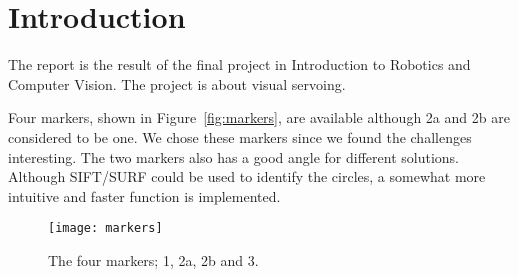 \section{Introduction}
The report is the result of the final project in Introduction to Robotics and Computer Vision.
The project is about visual servoing.

Four markers, shown in Figure~\vref{fig:markers}, are available although 2a and 2b are considered to be one.
We chose these markers since we found the challenges interesting.
The two markers also has a good angle for different solutions.
Although SIFT/SURF could be used to identify the circles, a somewhat more intuitive and faster function is implemented.



\begin{figure}
\centering
\texttt{[image: markers]}
\caption{The four markers; 1, 2a, 2b and 3.}
\label{fig:markers}
\end{figure}
